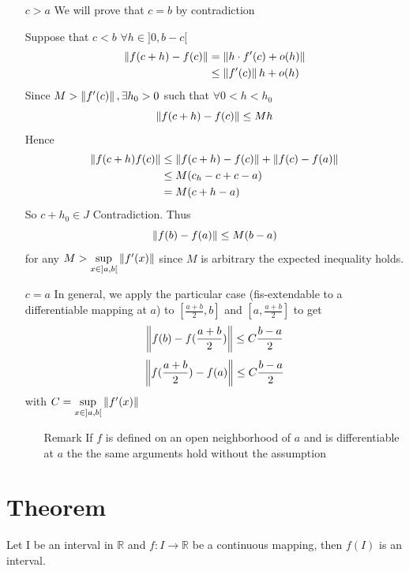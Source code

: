 \documentclass{book}
\begin{document}
\begin{itemize}
    \item [$c>a$]We will prove that $c=b$ by contradiction
    
    Suppose that $c<b$ $\forall h\in {]0,b-c[}$$$
    \begin{aligned}
        \left\lVert f(c+h)-f(c) \right\rVert &= \left\lVert h\cdot f'(c)+o(h) \right\rVert\\
        &\leq \left\lVert f'(c) \right\rVert h+o(h)
    \end{aligned}$$
    Since $M>\left\lVert f'(c) \right\rVert,\exists h_0>0$ such that $\forall 0<h<h_0$
    $$\left\lVert f(c+h)-f(c) \right\rVert\leq Mh$$Hence
    $$\begin{aligned}
        \left\lVert f(c+h)f(c) \right\rVert &\leq \left\lVert f(c+h)-f(c) \right\rVert+\left\lVert f(c)-f(a) \right\rVert\\
        &\leq M(c_h-c+c-a)\\
        &= M(c+h-a)
    \end{aligned}$$ So $c+h_0\in J$ Contradiction. Thus $$\left\lVert f(b)-f(a) \right\rVert\leq M(b-a)$$ for any $M>\sup\limits_{x\in {]a,b[}}\left\lVert f'(x) \right\rVert$ since $M$ is arbitrary the expected inequality holds.

    \item[$c=a$]In general, we apply the particular case (fis-extendable to a differentiable mapping at $a$) to $[\frac{a+b}{2},b]$ and $[a,\frac{a+b}{2}]$ to get $$\left\lVert f(b)-f(\frac{a+b}{2}) \right\rVert\leq C\frac{b-a}{2}$$
    $$\left\lVert f(\frac{a+b}{2})-f(a) \right\rVert\leq C\frac{b-a}{2}$$
    with $C=\sup\limits_{x\in {]a,b[}}\left\lVert f'(x) \right\rVert$
    \begin{itemize}
        \item [Remark]If $f$ is defined on an open neighborhood of $a$ and is differentiable at $a$ the the same arguments hold without the assumption
    \end{itemize}
\end{itemize}
\section{Theorem}
Let I be an interval in $\mathbb{R}$ and $f:I\rightarrow\mathbb{R}$ be a continuous mapping, then $f(I)$ is an interval.
\end{document}
